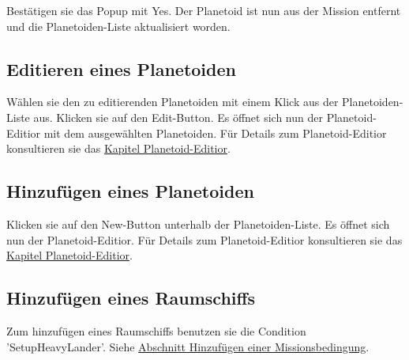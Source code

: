 Bestätigen sie das Popup mit Yes.
Der Planetoid ist nun aus der Mission entfernt und die Planetoiden-Liste aktualisiert worden.

\subsection{Editieren eines Planetoiden}
Wählen sie den zu editierenden Planetoiden mit einem Klick aus der Planetoiden-Liste aus.
Klicken sie auf den Edit-Button.
Es öffnet sich nun der Planetoid-Editior mit dem ausgewählten Planetoiden.
Für Details zum Planetoid-Editior konsultieren sie das \hyperlink{planetoideditor}{Kapitel Planetoid-Editior}.

\subsection{Hinzufügen eines Planetoiden}
Klicken sie auf den New-Button unterhalb der Planetoiden-Liste.
Es öffnet sich nun der Planetoid-Editior.
Für Details zum Planetoid-Editior konsultieren sie das \hyperlink{planetoideditor}{Kapitel Planetoid-Editior}.

\subsection{Hinzufügen eines Raumschiffs}
Zum hinzufügen eines Raumschiffs benutzen sie die Condition 'SetupHeavyLander'.
Siehe \hyperlink{addcondition}{Abschnitt Hinzufügen einer Missionsbedingung}.